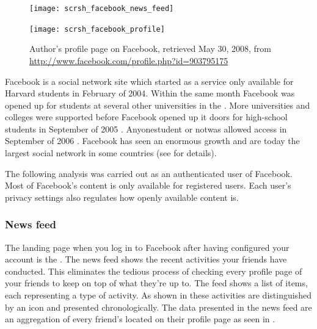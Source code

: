 \begin{figure}
  \captionstyle{\raggedright}
  \begin{whole}
    \begin{minipage}[t]{0.475\wholewidth}
  \texttt{[image: scrsh\_facebook\_news\_feed]}
      \caption[Facebook News Feed]{%
         Author's news feed on Facebook showing events, comments,
         photos, groups, persons, and status messages.
         Retrieved March 26, 2008, from \url{http://www.facebook.com/home.php}}
      \label{figure:scrsh.facebook.news.feed}
    \end{minipage}
    \hfill
    \begin{minipage}[t]{0.475\wholewidth}
      \texttt{[image: scrsh\_facebook\_profile]}
      \caption[Facebook Profile]{%
         Author's profile page on Facebook,
         retrieved May 30, 2008, from
         \url{http://www.facebook.com/profile.php?id=903795175}}
      \label{figure:scrsh.facebook.profile}
    \end{minipage}
  \end{whole}
  \normalcaption
\end{figure}

Facebook is a social network site which started as a service only available
for Harvard students in February of 2004. Within the same month Facebook was
opened up for students at several other universities in the . More
universities and colleges were supported before Facebook opened up it
doors for high-school students in September of 2005 \citep{cassidy06}.
Anyone\dash{}student or not\dash{}was allowed access in
September of 2006 \citep{abram06}.
Facebook has seen an enormous growth and are today the largest social network
in some countries (see
for details).

The following analysis was carried out as an authenticated user of Facebook.
Most of Facebook's content is only available for registered users. Each user's
privacy settings also regulates how openly available content is.

\subsubsection{News feed}
\label{section:analysis.facebook.news.feed}

The landing page when you log in to Facebook after having configured your
account is the  .
The news feed shows the recent activities your
friends have conducted. This eliminates the tedious process of checking every
profile page of your friends to keep on top of what they're up to.
The feed shows a list of items, each representing a type of activity. As
shown in 
these activities are distinguished by an
icon and presented chronologically. The data presented in the news feed are an
aggregation of every friend's  located on their profile page
 as seen in .

